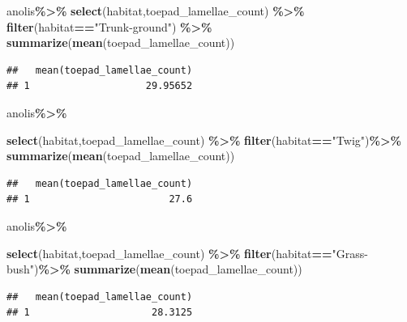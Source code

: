 \documentclass[
]{article}
\newenvironment{Shaded}{\begin{snugshade}}{\end{snugshade}}
\newcommand{\FunctionTok}[1]{\textcolor[rgb]{0.13,0.29,0.53}{\textbf{#1}}}
\newcommand{\NormalTok}[1]{#1}
\newcommand{\SpecialCharTok}[1]{\textcolor[rgb]{0.81,0.36,0.00}{\textbf{#1}}}
\newcommand{\StringTok}[1]{\textcolor[rgb]{0.31,0.60,0.02}{#1}}
\begin{document}
\begin{Shaded}
\begin{Highlighting}[]
\NormalTok{anolis}\SpecialCharTok{\%\textgreater{}\%} 
  \FunctionTok{select}\NormalTok{(habitat,toepad\_lamellae\_count) }\SpecialCharTok{\%\textgreater{}\%} 
  \FunctionTok{filter}\NormalTok{(habitat}\SpecialCharTok{==}\StringTok{"Trunk{-}ground"}\NormalTok{) }\SpecialCharTok{\%\textgreater{}\%} 
  \FunctionTok{summarize}\NormalTok{(}\FunctionTok{mean}\NormalTok{(toepad\_lamellae\_count)) }
\end{Highlighting}
\end{Shaded}

\begin{verbatim}
##   mean(toepad_lamellae_count)
## 1                    29.95652
\end{verbatim}

\begin{Shaded}
\begin{Highlighting}[]
\NormalTok{anolis}\SpecialCharTok{\%\textgreater{}\%} 
  
  \FunctionTok{select}\NormalTok{(habitat,toepad\_lamellae\_count) }\SpecialCharTok{\%\textgreater{}\%} 
  \FunctionTok{filter}\NormalTok{(habitat}\SpecialCharTok{==}\StringTok{"Twig"}\NormalTok{)}\SpecialCharTok{\%\textgreater{}\%} 
  \FunctionTok{summarize}\NormalTok{(}\FunctionTok{mean}\NormalTok{(toepad\_lamellae\_count))}
\end{Highlighting}
\end{Shaded}

\begin{verbatim}
##   mean(toepad_lamellae_count)
## 1                        27.6
\end{verbatim}

\begin{Shaded}
\begin{Highlighting}[]
\NormalTok{anolis}\SpecialCharTok{\%\textgreater{}\%} 
  
  
  \FunctionTok{select}\NormalTok{(habitat,toepad\_lamellae\_count) }\SpecialCharTok{\%\textgreater{}\%} 
  \FunctionTok{filter}\NormalTok{(habitat}\SpecialCharTok{==}\StringTok{"Grass{-}bush"}\NormalTok{)}\SpecialCharTok{\%\textgreater{}\%} 
  \FunctionTok{summarize}\NormalTok{(}\FunctionTok{mean}\NormalTok{(toepad\_lamellae\_count))}
\end{Highlighting}
\end{Shaded}

\begin{verbatim}
##   mean(toepad_lamellae_count)
## 1                     28.3125
\end{verbatim}
\end{document}
